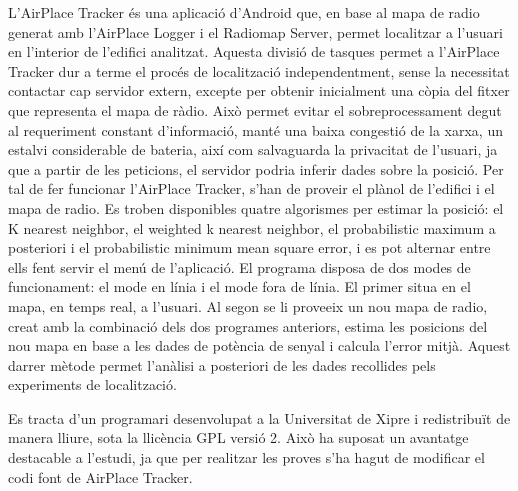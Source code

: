 L'AirPlace Tracker és una aplicació d'Android que, en base al mapa de radio generat amb l'AirPlace Logger i el Radiomap Server, permet localitzar a l'usuari en l'interior de l'edifici analitzat. Aquesta divisió de tasques permet a l'AirPlace Tracker dur a terme el procés de localització independentment, sense la necessitat contactar cap servidor extern, excepte per obtenir inicialment una còpia del fitxer que representa el mapa de ràdio. Això permet evitar el sobreprocessament degut al requeriment constant d'informació, manté una baixa congestió de la xarxa, un estalvi considerable de bateria, així com salvaguarda la privacitat de l'usuari, ja que a partir de les peticions, el servidor podria inferir dades sobre la posició.
Per tal de fer funcionar l'AirPlace Tracker, s'han de proveir el plànol de l'edifici i el mapa de radio. Es troben disponibles quatre algorismes per estimar la posició: el K nearest neighbor, el weighted k nearest neighbor, el probabilistic maximum a posteriori i el probabilistic minimum mean square error, i es pot alternar entre ells fent servir el menú de l'aplicació.
El programa disposa de dos modes de funcionament: el mode en línia i el mode fora de línia. El primer situa en el mapa, en temps real, a l'usuari. Al segon se li proveeix un nou mapa de radio, creat amb la combinació dels dos programes anteriors, estima les posicions del nou mapa en base a les dades de potència de senyal i calcula l'error mitjà. Aquest darrer mètode permet l'anàlisi a posteriori de les dades recollides pels experiments de localització.

Es tracta d'un programari desenvolupat a la Universitat de Xipre i redistribuït de manera lliure, sota la llicència GPL versió 2. Això ha suposat un avantatge destacable a l'estudi, ja que per realitzar les proves s'ha hagut de modificar el codi font de AirPlace Tracker.


